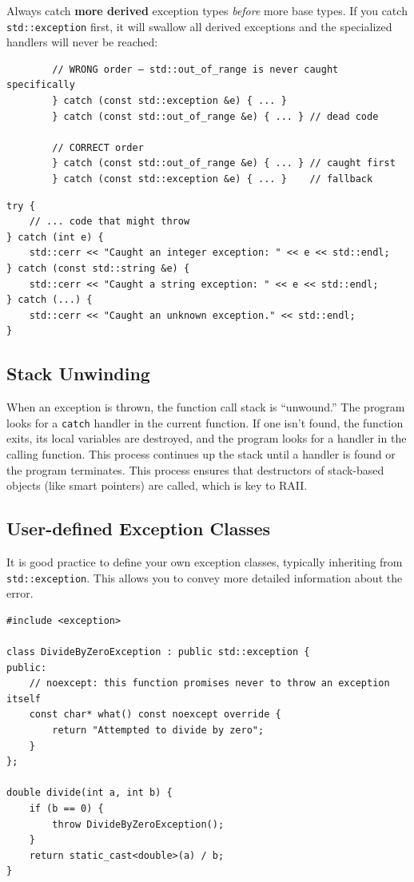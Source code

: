\begin{remark}
	Always catch \textbf{more derived} exception types \textit{before} more base types. If you catch \texttt{std::exception} first, it will swallow all derived exceptions and the specialized handlers will never be reached:
	\begin{lstlisting}
		// WRONG order — std::out_of_range is never caught specifically
		} catch (const std::exception &e) { ... }
		} catch (const std::out_of_range &e) { ... } // dead code

		// CORRECT order
		} catch (const std::out_of_range &e) { ... } // caught first
		} catch (const std::exception &e) { ... }    // fallback
	\end{lstlisting}
\end{remark}
\begin{lstlisting}
try {
	// ... code that might throw
} catch (int e) {
	std::cerr << "Caught an integer exception: " << e << std::endl;
} catch (const std::string &e) {
	std::cerr << "Caught a string exception: " << e << std::endl;
} catch (...) {
	std::cerr << "Caught an unknown exception." << std::endl;
}
\end{lstlisting}

\subsection{Stack Unwinding}
When an exception is thrown, the function call stack is ``unwound.'' The program looks for a \texttt{catch} handler in the current function. If one isn't found, the function exits, its local variables are destroyed, and the program looks for a handler in the calling function. This process continues up the stack until a handler is found or the program terminates. This process ensures that destructors of stack-based objects (like smart pointers) are called, which is key to RAII.

\subsection{User-defined Exception Classes}
It is good practice to define your own exception classes, typically inheriting from \texttt{std::exception}. This allows you to convey more detailed information about the error.
\begin{lstlisting}
#include <exception>

class DivideByZeroException : public std::exception {
public:
	// noexcept: this function promises never to throw an exception itself
	const char* what() const noexcept override {
		return "Attempted to divide by zero";
	}
};

double divide(int a, int b) {
	if (b == 0) {
		throw DivideByZeroException();
	}
	return static_cast<double>(a) / b;
}
\end{lstlisting}

